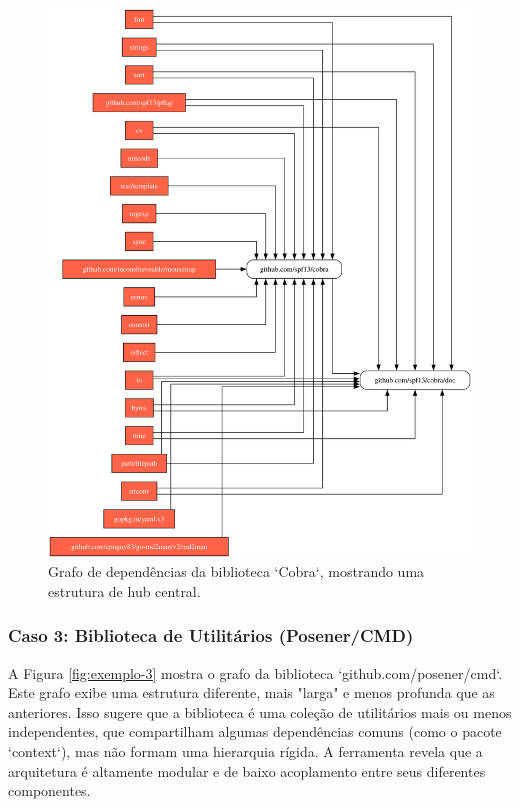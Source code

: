 \documentclass[12pt]{article}
\begin{document}
\begin{figure}[htbp]
\centering
\includegraphics[width=1\textwidth]{examples/github.com_spf13_cobra.png}
\caption{Grafo de dependências da biblioteca `Cobra`, mostrando uma estrutura de hub central.}
\label{fig:exemplo-2}
\end{figure}

\subsubsection{Caso 3: Biblioteca de Utilitários (Posener/CMD)}
A Figura \ref{fig:exemplo-3} mostra o grafo da biblioteca `github.com/posener/cmd`. Este grafo exibe uma estrutura diferente, mais "larga" e menos profunda que as anteriores. Isso sugere que a biblioteca é uma coleção de utilitários mais ou menos independentes, que compartilham algumas dependências comuns (como o pacote `context`), mas não formam uma hierarquia rígida. A ferramenta revela que a arquitetura é altamente modular e de baixo acoplamento entre seus diferentes componentes.
\end{document}
